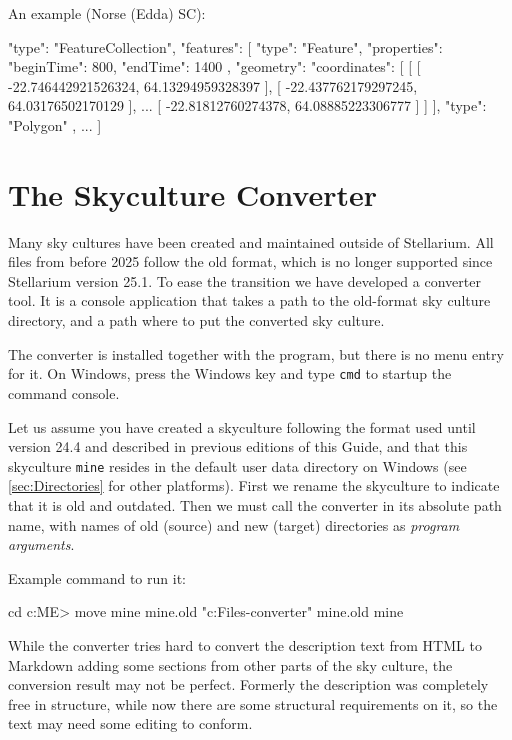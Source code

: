 An example (Norse (Edda) SC):

\begin{jsonfile}[\scriptsize]
{
  "type": "FeatureCollection",
  "features": [
    {
      "type": "Feature",
      "properties": {
	                  "beginTime": 800,
	                  "endTime": 1400	      
      },
      "geometry": {
        "coordinates": [
           [
                [ -22.746442921526324, 64.13294959328397 ],
                [ -22.437762179297245, 64.03176502170129 ],
                ...
                [ -22.81812760274378, 64.08885223306777 ]
           ]
        ],
        "type": "Polygon"
      }
    },
    ...
  ]
}
\end{jsonfile}

\section{The Skyculture Converter}
\label{ch:SkyCultures:converter}

Many sky cultures have been created and maintained outside of Stellarium. All files from before 2025 follow the old format, which is no longer supported since Stellarium version 25.1. 
To ease the transition we have developed a converter tool. It is a console application that takes a path to the old-format sky culture directory, 
and a path where to put the converted sky culture. 

The converter is installed together with the program, but there is no menu entry for it. 
On Windows, press the Windows key and type \texttt{cmd} to startup the command console. 

Let us assume you have created a skyculture following the format used until version 24.4 and described in previous editions of this Guide, 
and that this skyculture \texttt{mine} resides in the default user data directory on Windows (see \ref{sec:Directories} for other platforms). 
First we rename the skyculture to indicate that it is old and outdated. Then we must call the converter in its absolute path name, 
with names of old (source) and new (target) directories as \emph{program arguments}.

 
Example command to run it:

\begin{commands}[\footnotesize]
cd c:\Users\<ME>\AppData\Roaming\skycultures
move mine mine.old
"c:\Program Files\stellarium\skyculture-converter" mine.old mine
\end{commands}

While the converter tries hard to convert the description text from HTML to Markdown adding some sections from other parts of the sky culture, the conversion result may not be perfect. 
Formerly the description was completely free in structure, while now there are some structural requirements on it, so the text may need some editing to conform.

